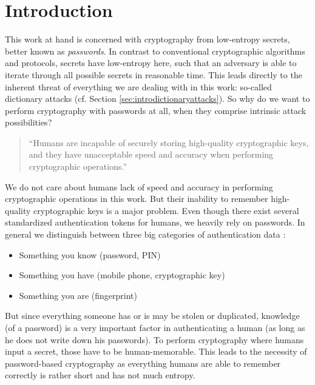 \cleardoublepage
\chapter{Introduction}\label{ch:introduction}

This work at hand is concerned with cryptography from low-entropy secrets, better known as \emph{passwords}.
In contrast to conventional cryptographic algorithms and protocols, secrets have low-entropy here, such that an adversary is able to iterate through all possible secrets in reasonable time.
This leads directly to the inherent threat of everything we are dealing with in this work: so-called dictionary attacks (cf. Section \ref{sec:introdictionaryattacks}).
So why do we want to perform cryptography with passwords at all, when they comprise intrinsic attack possibilities?

\begin{quote}
``Humans are incapable of securely storing high-quality cryptographic keys, and they have unacceptable speed and accuracy when performing cryptographic operations.''~\cite{Kaufmann02}
\end{quote}

\noindent
We do not care about humans lack of speed and accuracy in performing cryptographic operations in this work.
But their inability to remember high-quality cryptographic keys is a major problem.
Even though there exist several standardized authentication tokens for humans, we heavily rely on passwords.
In general we distinguish between three big categories of authentication data \cite{Burr11}:
\begin{itemize}
	\item Something you know (\eg password, \ac{PIN})
	\item Something you have (\eg mobile phone, cryptographic key)
	\item Something you are (\eg fingerprint)
\end{itemize}
But since everything someone has or is may be stolen or duplicated, knowledge (of a password) is a very important factor in authenticating a human (as long as he does not write down his passwords).
To perform cryptography where humans input a secret, those have to be human-memorable.
This leads to the necessity of password-based cryptography as everything humans are able to remember correctly is rather short and has not much entropy.

